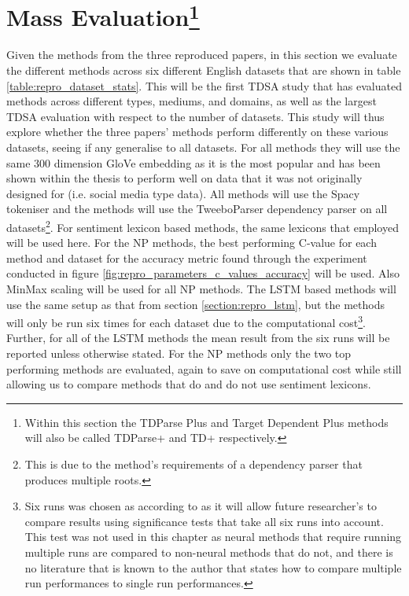 \FloatBarrier
\section[Mass Evaluation]{Mass Evaluation\footnote{Within this section the TDParse Plus and Target Dependent Plus methods will also be called TDParse+ and TD+ respectively.}}
\label{section:repro_mass_eval}


Given the methods from the three reproduced papers, in this section we evaluate the different methods across six different English datasets that are shown in table \ref{table:repro_dataset_stats}. This will be the first TDSA study that has evaluated methods across different types, mediums, and domains, as well as the largest TDSA evaluation with respect to the number of datasets. This study will thus explore whether the three papers' methods perform differently on these various datasets, seeing if any generalise to all datasets. For all methods they will use the same 300 dimension GloVe embedding as it is the most popular and has been shown within the thesis to perform well on data that it was not originally designed for (i.e. social media type data). All methods will use the Spacy tokeniser and the \citet{wang-etal-2017-tdparse} methods will use the TweeboParser \citep{kong-etal-2014-dependency} dependency parser on all datasets\footnote{This is due to the method's requirements of a dependency parser that produces multiple roots.}. For sentiment lexicon based methods, the same lexicons that \citet{wang-etal-2017-tdparse} employed will be used here. For the NP methods, the best performing C-value for each method and dataset for the accuracy metric found through the experiment conducted in figure \ref{fig:repro_parameters_c_values_accuracy} will be used. Also MinMax scaling will be used for all NP methods. The LSTM based methods will use the same setup as that from section \ref{section:repro_lstm}, but the methods will only be run six times for each dataset due to the computational cost\footnote{Six runs was chosen as according to \citet{reimers2018comparing} as it will allow future researcher's to compare results using significance tests that take all six runs into account. This test was not used in this chapter as neural methods that require running multiple runs are compared to non-neural methods that do not, and there is no literature that is known to the author that states how to compare multiple run performances to single run performances.}. Further, for all of the LSTM methods the mean result from the six runs will be reported unless otherwise stated. For the NP methods only the two top performing methods are evaluated, again to save on computational cost while still allowing us to compare methods that do and do not use sentiment lexicons. 

